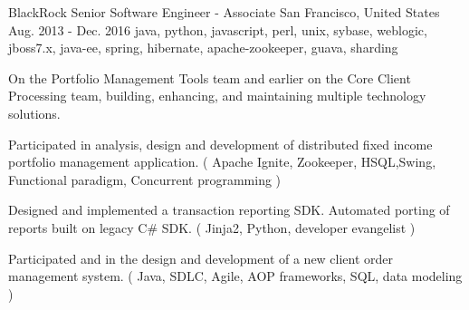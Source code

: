 \cventry
    {BlackRock} %
    {Senior Software Engineer - Associate} %
    {San Francisco, United States} %
    {Aug. 2013 - Dec. 2016} %
    {java, python, javascript, perl, unix, sybase, weblogic, jboss7.x, java-ee, spring, hibernate, apache-zookeeper, guava, sharding}%
    {
        On the Portfolio Management Tools team and earlier on the Core Client Processing team, building, enhancing, and maintaining multiple technology solutions.
    \begin{cvitems} %
        \item { Participated in analysis, design and development of distributed fixed income portfolio management application. ( Apache Ignite, Zookeeper, HSQL,Swing, Functional paradigm, Concurrent programming )}
        \item { Designed and implemented a transaction reporting SDK. Automated porting of reports built on legacy C\# SDK. ( Jinja2, Python, developer evangelist )}
        \item { Participated and in the design and development of a new client order management system. ( Java, SDLC, Agile, AOP frameworks, SQL, data modeling )}
    \end{cvitems}
    }